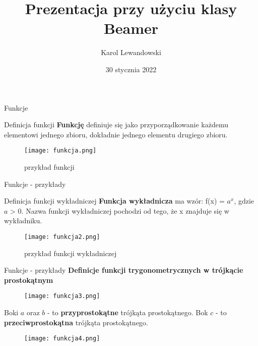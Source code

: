 \documentclass{beamer}
\title{Prezentacja przy użyciu klasy Beamer}
\author{Karol Lewandowski}
\date{30 stycznia 2022}
\begin{document}

\begin{frame}
\titlepage
\end{frame}

\begin{frame}[t]{Funkcje} \vspace{4pt}
\begin{block}{Definicja funkcji}
\vspace{0.5em}
\textbf{Funkcję} definiuje się jako przyporządkowanie każdemu elementowi jednego zbioru, dokładnie jednego elementu drugiego zbioru.
\vspace{0.5em}
\end{block}

\begin{figure}[h!]
\texttt{[image: funkcja.png]}
\caption{przykład funkcji}
\end{figure}

\end{frame}

\begin{frame}[t]{Funkcje - przykłady} \vspace{4pt}
\begin{block}{Definicja funkcji wykładniczej}
\vspace{0.5em}
\textbf{Funkcja wykładnicza} ma wzór: f(x) = $a^{x}$, gdzie $a$ > 0. Nazwa funkcji wykładniczej pochodzi od tego, że x znajduje się w wykładniku.
\vspace{0.5em}
\end{block}

\begin{figure}[h!]
\texttt{[image: funkcja2.png]}
\caption{przykład funkcji wykładniczej}
\end{figure}

\end{frame}

\begin{frame}[t]{Funkcje - przykłady} \vspace{4pt}
\textbf{Definicje funkcji trygonometrycznych w trójkącie prostokątnym}

\begin{figure}[h!]
\texttt{[image: funkcja3.png]}
\end{figure}


{\small Boki $a$ oraz $b$ - to \textbf{przyprostokątne} trójkąta prostokątnego.}
\newline
{\small Bok $c$ - to \textbf{przeciwprostokątna} trójkąta prostokątnego.}


\begin{figure}[h!]
\texttt{[image: funkcja4.png]}
\end{figure}

\end{frame}
\end{document}
